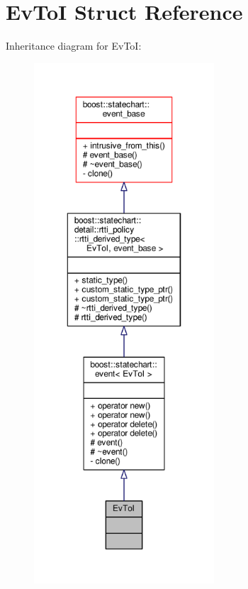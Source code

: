 \hypertarget{struct_ev_to_i}{}\section{Ev\+ToI Struct Reference}
\label{struct_ev_to_i}


Inheritance diagram for Ev\+ToI\+:
\nopagebreak
\begin{figure}[H]
\begin{center}
\leavevmode
\includegraphics[height=550pt]{struct_ev_to_i__inherit__graph}
\end{center}
\end{figure}


